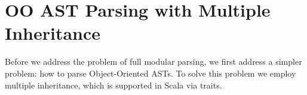 \begin{comment}
Basically, \name consists of four parts: underlying parsing technique, delegation mechanism encoded by open recursion, Object Algebras, and glue code of new combinators and utility functions. We start from Section \ref{subsec:overview-parsing}, which discusses the choice of parsing technique and how it affects modularity of parsers. Section \ref{subsec:overview-problem} demonstrates the goal of extending parsers together with ASTs in a semantic modular way, with both separate compilation and type-safe code reuse. Then we will see traditional parser combinators fail to achieve it because of hard-coded recursive calls. In Section \ref{subsec:overview-delegation}, we show how delegation can solve this problem and allow us to build extensible parsers. Finally, Section \ref{subsec:overview-oa} gives examples of using Object Algebras for more extensibility, including extension of operations and parsing multiple sorts of syntax.\haoyuan{TODO}
\end{comment}

\begin{comment}
It is worth mentioning that the choice of parser combinators will not
affect the other parts of our library. One can choose other parser
combinators like Parsec, in cases that the performance and supporting
of left-recursion are not major concerns. A different library can even build a new
\name with fancy features or higher efficiency.
\end{comment}


\section{\hspace{-10pt}OO AST Parsing with Multiple Inheritance}\label{sec:inheritance}

Before we address the problem of full modular parsing, we first
address a simpler problem: how to parse Object-Oriented ASTs. To solve
this problem we employ multiple inheritance, which is supported in
Scala via traits.

